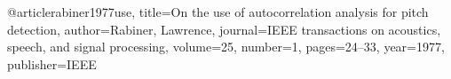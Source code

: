 @article{rabiner1977use,
  title={On the use of autocorrelation analysis for pitch detection},
  author={Rabiner, Lawrence},
  journal={IEEE transactions on acoustics, speech, and signal processing},
  volume={25},
  number={1},
  pages={24--33},
  year={1977},
  publisher={IEEE}
}
